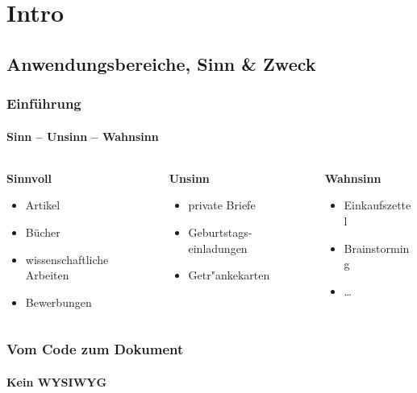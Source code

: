 \section{Intro} 

\subsection{Anwendungsbereiche, Sinn \& Zweck}
\begin{frame}[t]
\frametitle{Einf\"uhrung}
\framesubtitle{Sinn -- Unsinn -- Wahnsinn}
\bigskip
\bigskip
\bigskip

\begin{columns}[t]
\begin{column}{.3\textwidth}
\textbf{Sinnvoll}\\[3mm]
\begin{itemize}
\item Artikel
\item Bücher
\item wissenschaftliche Arbeiten
\item Bewerbungen
\end{itemize}
\end{column}
\begin{column}{.30\textwidth}
\textbf{Unsinn}\\[3mm]
\begin{itemize}
\item private Briefe
\item Geburtstags-einladungen
\item Getr"ankekarten
\end{itemize}
\end{column}
\begin{column}{.3\textwidth}
\textbf{Wahnsinn}\\[3mm]
\begin{itemize}
\item Einkaufszettel
\item Brainstorming
\item \ldots 
\end{itemize}
\end{column}
\end{columns}
\end{frame}


\begin{frame} 
\frametitle{Vom Code zum Dokument}
\framesubtitle{Kein WYSIWYG} 
\begin{columns}
\begin{column}{.7\textwidth}
\end{column}
\begin{column}{.3\textwidth}
\end{column}
\end{columns}
\end{frame}

